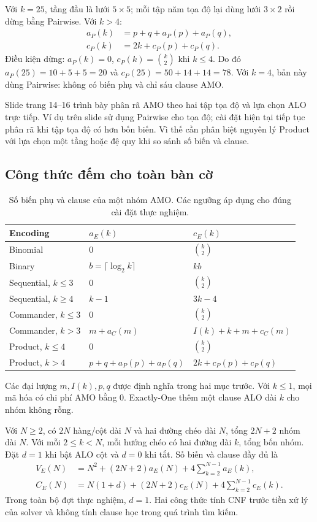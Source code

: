 Với $k=25$, tầng đầu là lưới $5\times5$; mỗi tập năm tọa độ lại dùng lưới $3\times2$ rồi dừng bằng Pairwise. Với $k>4$:
\begin{align}
a_P(k)&=p+q+a_P(p)+a_P(q),\\
c_P(k)&=2k+c_P(p)+c_P(q).
\label{eq:product-count}
\end{align}
Điều kiện dừng: $a_P(k)=0$, $c_P(k)=\binom k2$ khi $k\le4$. Do đó $a_P(25)=10+5+5=20$ và $c_P(25)=50+14+14=78$. Với $k=4$, bản này dùng Pairwise: không có biến phụ và chỉ sáu clause AMO.

Slide trang 14--16 \citep{amoSlides} trình bày phân rã AMO theo hai tập tọa độ và lựa chọn ALO trực tiếp. Ví dụ trên slide sử dụng Pairwise cho tọa độ; cài đặt hiện tại tiếp tục phân rã khi tập tọa độ có hơn bốn biến. Vì thế cần phân biệt nguyên lý Product với lựa chọn một tầng hoặc đệ quy khi so sánh số biến và clause.

\subsection{Công thức đếm cho toàn bàn cờ}
\begin{table}[pos=H]\centering\small
\caption{Số biến phụ và clause của một nhóm AMO. Các ngưỡng áp dụng cho đúng cài đặt thực nghiệm.}
\label{tab:group-counts}
\begin{tabular}{@{}lll@{}}\toprule
Encoding & $a_E(k)$ & $c_E(k)$\\\midrule
Binomial & $0$ & $\binom{k}{2}$\\
Binary & $b=\lceil\log_2 k\rceil$ & $kb$\\
Sequential, $k\le3$ & $0$ & $\binom{k}{2}$\\
Sequential, $k\ge4$ & $k-1$ & $3k-4$\\
Commander, $k\le3$ & $0$ & $\binom{k}{2}$\\
Commander, $k>3$ & $m+a_C(m)$ & $I(k)+k+m+c_C(m)$\\
Product, $k\le4$ & $0$ & $\binom{k}{2}$\\
Product, $k>4$ & $p+q+a_P(p)+a_P(q)$ & $2k+c_P(p)+c_P(q)$\\
\bottomrule\end{tabular}
\end{table}
Các đại lượng $m,I(k),p,q$ được định nghĩa trong hai mục trước. Với $k\le1$, mọi mã hóa có chi phí AMO bằng 0. Exactly-One thêm một clause ALO dài $k$ cho nhóm không rỗng.

Với $N\ge2$, có $2N$ hàng/cột dài $N$ và hai đường chéo dài $N$, tổng $2N+2$ nhóm dài $N$. Với mỗi $2\le k<N$, mỗi hướng chéo có hai đường dài $k$, tổng bốn nhóm. Đặt $d=1$ khi bật ALO cột và $d=0$ khi tắt. Số biến và clause đầy đủ là
\begin{align}
V_E(N)&=N^2+(2N+2)a_E(N)+4\sum_{k=2}^{N-1}a_E(k),\\
C_E(N)&=N(1+d)+(2N+2)c_E(N)+4\sum_{k=2}^{N-1}c_E(k).
\label{eq:whole-count}
\end{align}
Trong toàn bộ đợt thực nghiệm, $d=1$. Hai công thức tính CNF trước tiền xử lý của solver và không tính clause học trong quá trình tìm kiếm.

